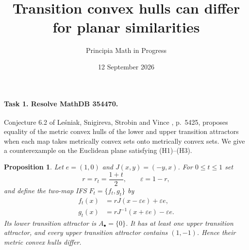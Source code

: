 \documentclass[11pt]{article}
\title{Transition convex hulls can differ for planar similarities}
\author{Principia Math in Progress}
\date{12 September 2026}
\newtheorem{proposition}{Proposition}
\newcommand{\Al}{A_{\bullet}}
\begin{document}
\maketitle
\paragraph{Task 1. Resolve MathDB 354470.}
Conjecture 6.2 of Le\'sniak, Snigireva, Strobin and Vince
\cite{source}, p.~5425, proposes equality of the metric convex hulls
of the lower and upper transition attractors when each map takes
metrically convex sets onto metrically convex sets. We give a
counterexample on the Euclidean plane satisfying (H1)--(H3).

\begin{proposition}
Let $e=(1,0)$ and $J(x,y)=(-y,x)$. For $0\leq t\leq1$ set
\[
 r=r_t=\frac{1+t}{2},\qquad \varepsilon=1-r,
\]
and define the two-map IFS $F_t=\{f_t,g_t\}$ by
\begin{align*}
 f_t(x)&=rJ(x-\varepsilon e)+\varepsilon e,\\
 g_t(x)&=rJ^{-1}(x+\varepsilon e)-\varepsilon e.
\end{align*}
Its lower transition attractor is $\Al=\{0\}$. It has at least one
upper transition attractor, and every upper transition attractor
contains $(1,-1)$. Hence their metric convex hulls differ.
\end{proposition}
\end{document}
